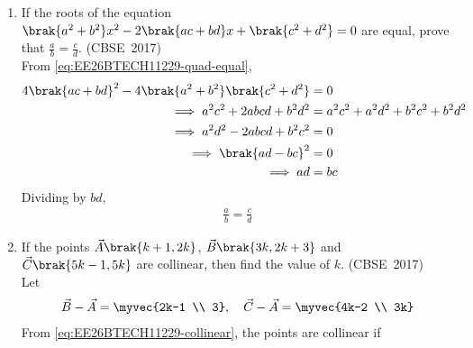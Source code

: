 \begin{enumerate}[label=\thesubsection.\arabic*, ref=\thesubsection.\theenumi]
How many terms of an A.P. $9, 17, 25, \ldots$ must be taken to give a sum of 636 ?
\hfill (CBSE~2017)
\\
\solution
Here $a = 9$ and $d = 8$. From \eqref{eq:EE26BTECH11229-ap-sum},
\begin{align}
	\frac{n}{2}\sbrak{18 + 8\brak{n-1}} &= 636
	\\
	\implies 4n^2 + 5n - 636 &= 0
\end{align}
From \eqref{eq:EE26BTECH11229-quad-formula},
\begin{align}
	n = \frac{-5 \pm \sqrt{25 + 10176}}{8} = \frac{-5 \pm 101}{8}
\end{align}
Since $n$ is positive,
\begin{align}
	n = 12
\end{align}
The following code verifies the solution
\begin{lstlisting}[frame=single, basicstyle=\rmfamily, escapeinside={(*@}{@*)}]
(*@\makebox[\dimexpr\linewidth-2\fboxsep-2\fboxrule\relax][c]{codes/ap\_sum.c}@*)
\end{lstlisting}
\item 
If the roots of the equation $\brak{a^2 + b^2}x^2 - 2\brak{ac + bd}x + \brak{c^2 + d^2} = 0$ are equal, prove that $\frac{a}{b} = \frac{c}{d}$.
\hfill (CBSE~2017)
\\
\solution
From \eqref{eq:EE26BTECH11229-quad-equal},
\begin{align}
	4\brak{ac + bd}^2 - 4\brak{a^2 + b^2}\brak{c^2 + d^2} &= 0
	\\
	\implies a^2c^2 + 2abcd + b^2d^2 &= a^2c^2 + a^2d^2 + b^2c^2 + b^2d^2
	\\
	\implies a^2d^2 - 2abcd + b^2c^2 &= 0
	\\
	\implies \brak{ad - bc}^2 &= 0
	\\
	\implies ad &= bc
\end{align}
Dividing by $bd$,
\begin{align}
	\frac{a}{b} = \frac{c}{d}
\end{align}
\item 
If the points $\vec{A}\brak{k+1, 2k}$, $\vec{B}\brak{3k, 2k+3}$ and $\vec{C}\brak{5k-1, 5k}$ are collinear, then find the value of $k$.
\hfill (CBSE~2017)
\\
\solution
Let
\begin{align}
	\vec{B} - \vec{A} = \myvec{2k-1 \\ 3}, \quad \vec{C} - \vec{A} = \myvec{4k-2 \\ 3k}
\end{align}
From \eqref{eq:EE26BTECH11229-collinear}, the points are collinear if

\end{enumerate}
